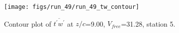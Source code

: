\begin{figure}[H]
\centering
\texttt{[image: figs/run\_49/run\_49\_tw\_contour]}
\caption{Contour plot of $\overline{t^\prime w^\prime}$ at $z/c$=9.00, $V_{free}$=31.28, station 5.}
\label{fig:run_49_tw_contour}
\end{figure}


